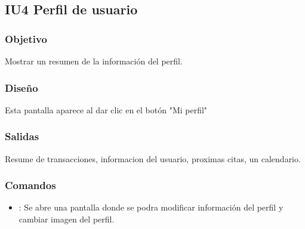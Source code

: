 
\subsection{IU4 Perfil de usuario}

\subsubsection{Objetivo}
	Mostrar un resumen de la información del perfil.
	
\subsubsection{Diseño}
	Esta pantalla aparece al dar clic en el botón "Mi perfil" 	


\subsubsection{Salidas}

	Resume de transacciones, informacion del usuario, proximas citas, un calendario.
	

\subsubsection{Comandos}
\begin{itemize}
	\item {}: Se abre una pantalla donde se podra modificar información del perfil y cambiar imagen del perfil.
\end{itemize}
